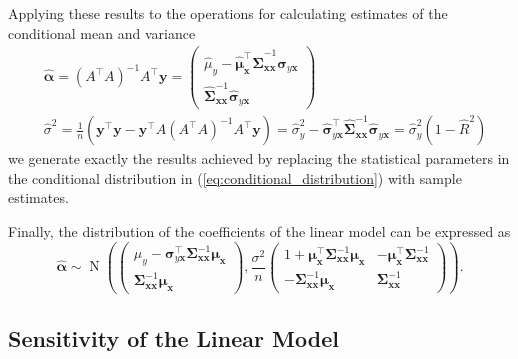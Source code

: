 \documentclass[12pt, twoside, draft]{article}
\begin{document}
Applying these results to the operations for calculating estimates of the conditional mean and variance
\begin{align}
&\hat{\boldsymbol{\alpha}} = (A^\top A)^{-1} A^\top \mathbf{y} = 
\begin{pmatrix}
\hat{\mu}_y - \hat{\boldsymbol{\mu}}^\top_{\mathbf{x}}\hat{\boldsymbol{\Sigma}}_{\mathbf{x}\mathbf{x}}^{-1} \hat{\boldsymbol{\sigma}}_{y\mathbf{x}} \\ \hat{\boldsymbol{\Sigma}}_{\mathbf{x}\mathbf{x}}^{-1} \hat{\boldsymbol{\sigma}}_{y\mathbf{x}}
\end{pmatrix} \\
&\hat{\sigma}^2 = \frac{1}{n}\left( \mathbf{y}^\top \mathbf{y} - \mathbf{y}^\top A (A^\top A)^{-1} A^\top \mathbf{y} \right)= \hat{\sigma}^2_y - \hat{\boldsymbol{\sigma}}_{y \mathbf{x}}^\top \hat{\boldsymbol{\Sigma}}^{-1}_{\mathbf{x} \mathbf{x}} \hat{\boldsymbol{\sigma}}_{y \mathbf{x}} = \hat{\sigma}^2_y \left( 1 - \hat{R}^2 \right)
\end{align}
we generate exactly the results achieved by replacing the statistical parameters in the conditional distribution in (\ref{eq:conditional_distribution}) with sample estimates.

Finally, the distribution of the coefficients of the linear model can be expressed as
\begin{equation}
\hat{\boldsymbol{\alpha}} \sim \operatorname{N} \left( \begin{pmatrix} \mu_y - \boldsymbol{\sigma}_{y\mathbf{x}}^\top \boldsymbol{\Sigma}^{-1}_{\mathbf{x} \mathbf{x}} \boldsymbol{\mu}_{\mathbf{x}} \\ \boldsymbol{\Sigma}^{-1}_{\mathbf{x} \mathbf{x}} \boldsymbol{\mu}_{\mathbf{x}} \end{pmatrix}, \frac{\sigma^2}{n} 
\begin{pmatrix}
1 + \boldsymbol{\mu}^\top_{\mathbf{x}}\boldsymbol{\Sigma}_{\mathbf{x}\mathbf{x}}^{-1} \boldsymbol{\mu}_{\mathbf{x}} & -\boldsymbol{\mu}^\top_{\mathbf{x}}\boldsymbol{\Sigma}_{\mathbf{x}\mathbf{x}}^{-1} \\
-\boldsymbol{\Sigma}_{\mathbf{x}\mathbf{x}}^{-1} \boldsymbol{\mu}_{\mathbf{x}} & \boldsymbol{\Sigma}_{\mathbf{x}\mathbf{x}}^{-1}
\end{pmatrix}
\right).
\end{equation}

\subsection{Sensitivity of the Linear Model}
\end{document}

